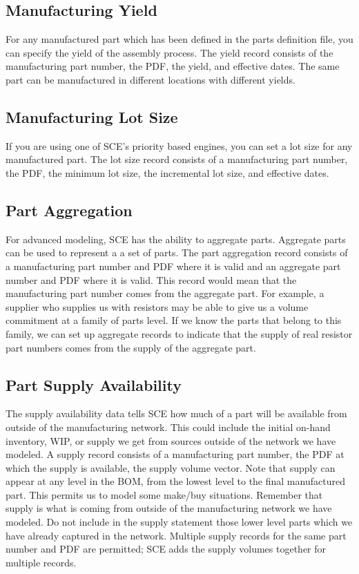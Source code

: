 \subsection{Manufacturing Yield}
For any manufactured part which has been defined in the parts
definition file, you can specify the yield of the assembly process.
The yield record consists of the manufacturing part number, the PDF,
the yield, and effective dates.  The same part can be manufactured in different
locations with different yields.

\subsection{Manufacturing Lot Size}
If you are using one of SCE's priority based engines, you can set a
lot size for any manufactured part.  The lot size record consists of a
manufacturing part number, the PDF, the minimum lot size, the
incremental lot size, and effective dates.

\subsection{Part Aggregation}
For advanced modeling, SCE has the ability to aggregate parts.
Aggregate parts can be used to represent a a set of parts.
 The part aggregation record consists of a
manufacturing part number and PDF where it is valid and an aggregate
part number and PDF where it is valid.  This record would mean that
the manufacturing part number comes from the aggregate part.  For
example, a supplier who supplies us with resistors may be able to give
us a volume commitment at a family of parts level.  If we know the
parts that belong to this family, we can set up aggregate records to
indicate that the supply of real resistor part numbers comes from the
supply of the aggregate part.

\subsection{Part Supply Availability}
The supply availability data tells SCE how much of a part will be
available from outside of the manufacturing network.  This could
include the initial on-hand inventory, WIP, or supply we get from
sources outside of the network we have modeled.  A supply record
consists of a manufacturing part number, the PDF at which the supply
is available, the supply volume vector.  Note that supply can appear
at any level in the BOM, from the lowest level to the final
manufactured part.  This permits us to model some make/buy situations.
Remember that supply is what is coming from outside of the
manufacturing network we have modeled.  Do not include in the supply
statement those lower level parts which we have already captured in
the network.  Multiple supply records for the same part number and PDF are
permitted;  SCE adds the supply volumes together for multiple records.

